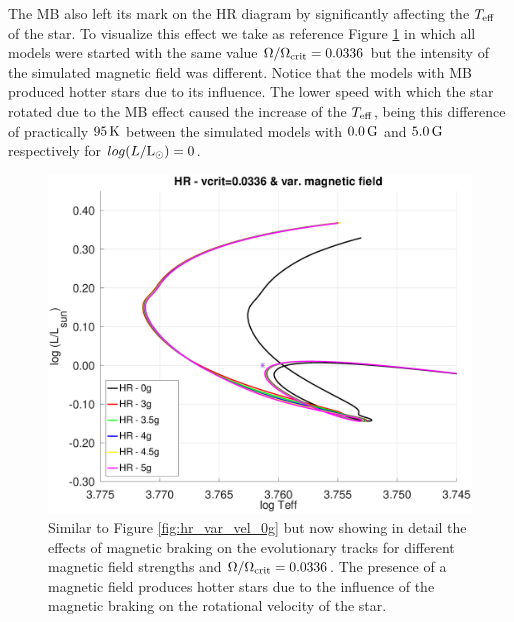 \documentclass[fleqn,usenatbib]{mnras}
\begin{document}
The MB also left its mark on the HR diagram by significantly affecting the $T_{\mathrm{eff}}$ of the star. To visualize this effect we take as reference Figure \ref{hr_vc_0336_var_g_z1} in which all models were started with the same value $\Omega / \Omega_{\mathrm{crit}}=0.0336$ but the intensity of the simulated magnetic field was different. Notice that the models with MB produced hotter stars due to its influence. The lower speed with which the star rotated due to the MB effect caused the increase of the $T_{\mathrm{eff}}$, being this difference of practically $95\,\mathrm{K}$ between the simulated models with $0.0\,\mathrm{G}$ and $5.0\,\mathrm{G}$ respectively for $log(L/\mathrm{L}_\odot)=0$.

\begin{figure}
	\includegraphics[trim = 10mm 10mm 15mm 10mm, clip,width=\columnwidth]{figures/hr_vc_0336_var_g_z1.eps}
    \caption{Similar to Figure \ref{fig:hr_var_vel_0g} but now showing in detail the effects of magnetic braking on the evolutionary tracks for different magnetic field strengths and $\Omega / \Omega_{\mathrm{crit}}=0.0336$. The presence of a magnetic field produces hotter stars due to the influence of the magnetic braking on the rotational velocity of the star.}
    \label{hr_vc_0336_var_g_z1}
\end{figure}
\end{document}
